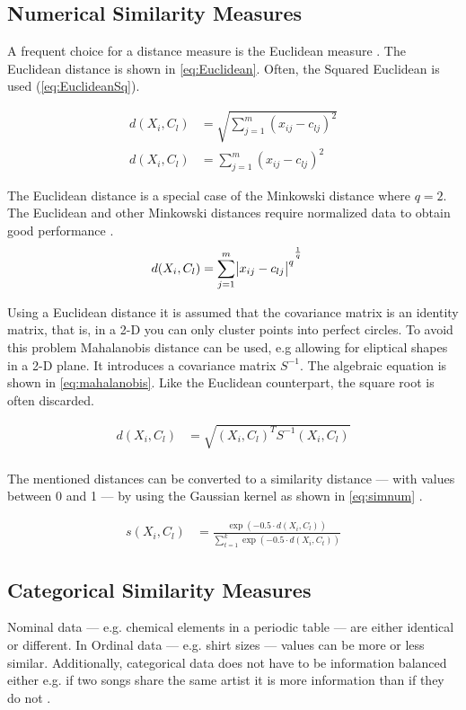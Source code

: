 \documentclass[../report.tex]{subfiles}
\begin{document}
\subsection{Numerical Similarity Measures}

A frequent choice for a distance measure is the Euclidean measure \cite{Jain1999}. The Euclidean distance is shown in \ref{eq:Euclidean}. Often, the Squared Euclidean is used (\ref{eq:EuclideanSq}).

\begin{align}
  \label{eq:Euclidean}
  d(X_i,C_l) &= \sqrt{\sum^{m}_{j=1}(x_{ij} - c_{lj})^2} \\
  \label{eq:EuclideanSq}
  d(X_i,C_l) &= \sum^{m}_{j=1}(x_{ij} - c_{lj})^2
\end{align}

The Euclidean distance is a special case of the Minkowski distance where $q=2$. The Euclidean and other Minkowski distances require normalized data to obtain good performance \cite{Jain1999}. \begin{align}
  \label{eq:mikowski}
  d(X_i,C_l) &= {\sum^{m}_{j=1}\abs{x_{ij} - c_{lj}}^q}^{\frac{1}{q}}
\end{align}

Using a Euclidean distance it is assumed that the covariance matrix is an identity matrix, that is, in a 2-D you can only cluster points into perfect circles. To avoid this problem Mahalanobis distance can be used, e.g allowing for eliptical shapes in a 2-D plane. It introduces a covariance matrix $S^{-1}$. The algebraic equation is shown in \ref{eq:mahalanobis}. Like the Euclidean counterpart, the square root is often discarded. 

\begin{align}
  \label{eq:mahalanobis}
  d(X_i,C_l) &= \sqrt{(X_i, C_l)^T S^{-1} (X_i, C_l)} \\
\end{align}

The mentioned distances can be converted to a similarity distance --- with values between 0 and 1 --- by using the Gaussian kernel as shown in \ref{eq:simnum} \cite{Cheung2013}.

\begin{align}
  \label{eq:simnum}
    s(X_i,C_l) &= \frac{\exp(-0.5 \cdot d(X_i,C_l))}{\sum^k_{t=1}\exp(-0.5 \cdot d(X_i,C_t))}
\end{align}


\subsection{Categorical Similarity Measures}
Nominal data --- e.g. chemical elements in a periodic table  --- are either identical or different. In Ordinal data --- e.g. shirt sizes --- values can be more or less similar. Additionally, categorical data does not have to be information balanced either e.g. if two songs share the same artist it is more information than if they do not \cite{Kaufman1990}.
\end{document}
